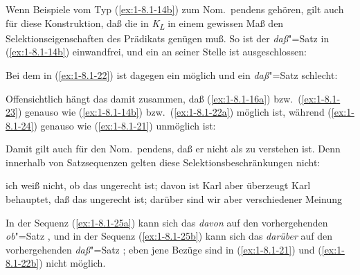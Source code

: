\documentclass[output=paper]{langsci/langscibook}
\begin{document}
Wenn Beispiele vom Typ (\ref{ex:1-8.1-14b}) zum Nom.\ pendens gehören, gilt auch für diese
Konstruktion, daß die  in \textit{K\textsubscript{L}} in einem gewissen Maß den Selektionseigenschaften des Prädikats genügen muß. So ist der \textit{daß}"=Satz in (\ref{ex:1-8.1-14b}) einwandfrei,
und ein  an seiner Stelle ist ausgeschlossen:
\begin{exe}
\end{exe}
Bei dem  in (\ref{ex:1-8.1-22}) ist dagegen ein  möglich und ein \textit{daß}"=Satz
schlecht:
\begin{exe}
\ex\label{ex:1-8.1-22}
\begin{xlist}
\end{xlist}
\end{exe}
\addlines
Offensichtlich hängt das damit zusammen, daß (\ref{ex:1-8.1-16a}) bzw.\ (\ref{ex:1-8.1-23}) genauso wie (\ref{ex:1-8.1-14b})
bzw.\ (\ref{ex:1-8.1-22a}) möglich ist, während (\ref{ex:1-8.1-24}) genauso wie (\ref{ex:1-8.1-21}) unmöglich ist:
\begin{exe}
\end{exe}
Damit gilt auch für den Nom.\ pendens, daß er nicht als  zu
verstehen ist. Denn innerhalb von Satzsequenzen gelten diese Selektionsbeschränkungen nicht:
\begin{exe}
\ex\label{ex:1-8.1-25}
\begin{xlist}
\ex\label{ex:1-8.1-25a} ich weiß nicht, ob das ungerecht ist; davon ist Karl aber überzeugt
\ex\label{ex:1-8.1-25b} Karl behauptet, daß das ungerecht ist; darüber sind wir aber verschiedener Meinung
\end{xlist}
\end{exe}
In der Sequenz (\ref{ex:1-8.1-25a}) kann sich das \textit{davon} auf den vorhergehenden \textit{ob}"=Satz , und in der Sequenz (\ref{ex:1-8.1-25b}) kann sich das \textit{darüber} auf den vorhergehenden \textit{daß}"=Satz ; eben jene Bezüge sind in (\ref{ex:1-8.1-21}) und (\ref{ex:1-8.1-22b}) nicht möglich.
\end{document}
